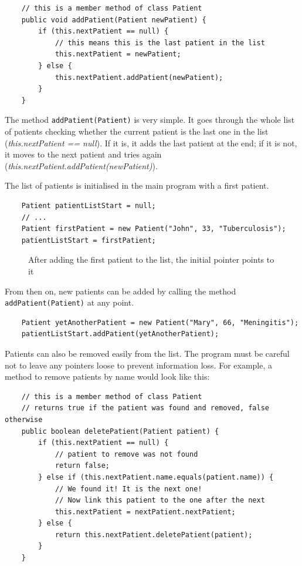 \begin{verbatim}
    // this is a member method of class Patient
    public void addPatient(Patient newPatient) {
        if (this.nextPatient == null) {
            // this means this is the last patient in the list
            this.nextPatient = newPatient;
        } else {
            this.nextPatient.addPatient(newPatient);
        }
    }            
\end{verbatim}

The method \verb+addPatient(Patient)+ is very simple. It goes through
the whole list of patients checking whether the current patient is the
last one in the list (\emph{this.nextPatient == null}). 
If it is, it adds the last patient at the
end; if it is not, it moves to the next patient and tries 
again (\emph{this.nextPatient.addPatient(newPatient)}). 

The list of patients is initialised in the main program with a first
patient. 

\begin{verbatim}
    Patient patientListStart = null;
    // ...
    Patient firstPatient = new Patient("John", 33, "Tuberculosis");
    patientListStart = firstPatient;
\end{verbatim}

\begin{figure}[bthp]
  \centering
  
  \caption{After adding the first patient to the list, the initial pointer points to it}
  \label{fig:jkhsdfj}
\end{figure}

From then on, new patients can be added by calling the
method \verb+addPatient(Patient)+ at any point. 

\begin{verbatim}
    Patient yetAnotherPatient = new Patient("Mary", 66, "Meningitis");
    patientListStart.addPatient(yetAnotherPatient);
\end{verbatim}


Patients can also be removed easily from the list. The program must be
careful not to leave any pointers loose to prevent information
loss. For example, a method to remove patients by name would look like
this: 

\begin{verbatim}
    // this is a member method of class Patient
    // returns true if the patient was found and removed, false otherwise
    public boolean deletePatient(Patient patient) {
        if (this.nextPatient == null) {
            // patient to remove was not found
            return false;
        } else if (this.nextPatient.name.equals(patient.name)) {
            // We found it! It is the next one!
            // Now link this patient to the one after the next 
            this.nextPatient = nextPatient.nextPatient;
        } else {
            return this.nextPatient.deletePatient(patient);
        }
    }    
\end{verbatim}

